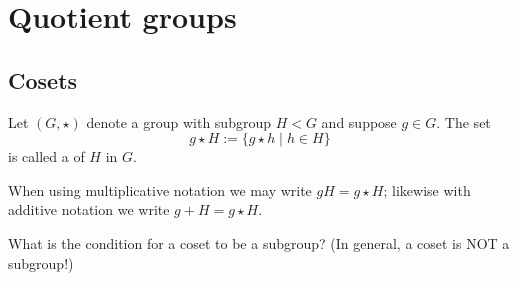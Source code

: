 \documentclass[../algebraNotesMSRI-UP2016.tex]{subfiles}
\begin{document}
\section[\S \thesection]{Quotient groups}\label{sec:2p7quotientGroups}
\subsection[\subsecname]{Cosets}
\begin{frame}{\subsecname}
\begin{dfn}
Let $(G,\star)$ denote a group with subgroup $H< G$ and suppose $g\in G$.  The set
\[
g\star H:=\{g\star h\mid h\in H\}
\]
is called a  of $H$ in $G$.  %
\end{dfn}

\smallGap
When using multiplicative notation we may write $gH=g\star H$; likewise with additive notation we write $g+H=g\star H$.

\smallGap
\begin{que}
What is the condition for a coset to be a subgroup?  (In general, a coset is NOT a subgroup!)
\end{que}
\end{frame}

\end{document}
